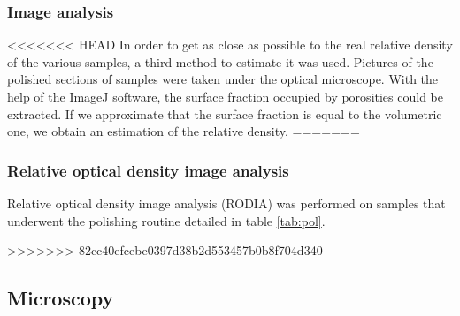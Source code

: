 \subsubsection{Image analysis}

<<<<<<< HEAD
In order to get as close as possible to the real relative density of the various samples, a third method to estimate it was used. Pictures of the polished sections of samples were taken under the optical microscope. With the help of the ImageJ software, the surface fraction occupied by porosities could be extracted. If we approximate that the surface fraction is equal to the volumetric one, we obtain an estimation of the relative density.
=======
\subsubsection{Relative optical density image analysis}

Relative optical density image analysis (RODIA) was performed on samples that underwent the polishing routine detailed in table \ref{tab:pol}.

 \begin{center}
\begin{table}[ht]
\noindent{}
\label{tab:pol}
\caption[Polishing routine for Al-Si alloys]{Polishing routine for Al-Si alloys}
\end{table}
 \end{center}
>>>>>>> 82cc40efcebe0397d38b2d553457b0b8f704d340

\subsection{Microscopy}

